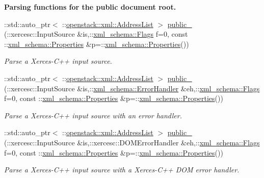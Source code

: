 \begin{Indent}{\bf Parsing functions for the public document root.}
\begin{DoxyCompactItemize}
::std::auto\_\-ptr$<$ ::\hyperlink{classopenstack_1_1xml_1_1AddressList}{openstack::xml::AddressList} $>$ \hyperlink{namespaceopenstack_1_1xml_a523cb0e2c2b510081d39dfb9915a04ea}{public\_\-} (::xercesc::InputSource \&is,::\hyperlink{namespacexml__schema_affb4c227cbd9aa7453dd1dc5a1401943}{xml\_\-schema::Flags} f=0, const ::\hyperlink{namespacexml__schema_ad27ce19a7ee1d3b1064092648898f64c}{xml\_\-schema::Properties} \&p=::\hyperlink{namespacexml__schema_ad27ce19a7ee1d3b1064092648898f64c}{xml\_\-schema::Properties}())
\begin{DoxyCompactList}\small\item\em Parse a Xerces-\/C++ input source. \item\end{DoxyCompactList}\item 
::std::auto\_\-ptr$<$ ::\hyperlink{classopenstack_1_1xml_1_1AddressList}{openstack::xml::AddressList} $>$ \hyperlink{namespaceopenstack_1_1xml_af7589ffb5318b23868543e540e1c6f86}{public\_\-} (::xercesc::InputSource \&is,::\hyperlink{namespacexml__schema_ab1c9361bfd3b404eaabf0c31eded79dc}{xml\_\-schema::ErrorHandler} \&eh,::\hyperlink{namespacexml__schema_affb4c227cbd9aa7453dd1dc5a1401943}{xml\_\-schema::Flags} f=0, const ::\hyperlink{namespacexml__schema_ad27ce19a7ee1d3b1064092648898f64c}{xml\_\-schema::Properties} \&p=::\hyperlink{namespacexml__schema_ad27ce19a7ee1d3b1064092648898f64c}{xml\_\-schema::Properties}())
\begin{DoxyCompactList}\small\item\em Parse a Xerces-\/C++ input source with an error handler. \item\end{DoxyCompactList}\item 
::std::auto\_\-ptr$<$ ::\hyperlink{classopenstack_1_1xml_1_1AddressList}{openstack::xml::AddressList} $>$ \hyperlink{namespaceopenstack_1_1xml_a75c7bca0ef982957a00399adbc0b8270}{public\_\-} (::xercesc::InputSource \&is,::xercesc::DOMErrorHandler \&eh,::\hyperlink{namespacexml__schema_affb4c227cbd9aa7453dd1dc5a1401943}{xml\_\-schema::Flags} f=0, const ::\hyperlink{namespacexml__schema_ad27ce19a7ee1d3b1064092648898f64c}{xml\_\-schema::Properties} \&p=::\hyperlink{namespacexml__schema_ad27ce19a7ee1d3b1064092648898f64c}{xml\_\-schema::Properties}())
\begin{DoxyCompactList}\small\item\em Parse a Xerces-\/C++ input source with a Xerces-\/C++ DOM error handler. \item\end{DoxyCompactList}\item 

\end{DoxyCompactItemize}
\end{Indent}
